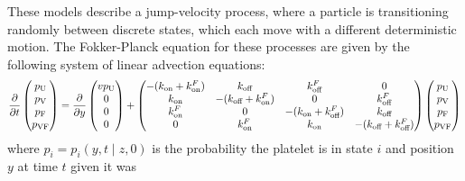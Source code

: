 \documentclass{article}
\newcommand{\tn}{\textnormal}
\newcommand{\Pder}[2]{\frac{\partial #1}{\partial #2}}
\begin{document}
These models describe a jump-velocity process, where a particle is
transitioning randomly between discrete states, which each move with a
different deterministic motion. The Fokker-Planck equation for these
processes are given by the following system of linear advection
equations:
\begin{equation}
  \Pder{}{t}
  \begin{pmatrix}
    p_\tn{U} \\ p_\tn{V} \\ p_\tn{F} \\ p_\tn{VF}
  \end{pmatrix}
  =
  \Pder{}{y}
  \begin{pmatrix}
    v p_\tn{U} \\ 0 \\ 0 \\ 0
  \end{pmatrix}
  +
  \begin{pmatrix}
    -(k_\tn{on} + k_\tn{on}^F) & k_\tn{off} & k_\tn{off}^F & 0 \\
    k_\tn{on} & -(k_\tn{off} + k_\tn{on}^F) & 0 & k_\tn{off}^F \\
    k_\tn{on}^F & 0 & -(k_\tn{on} + k_\tn{off}^F) & k_\tn{off} \\
    0 & k_\tn{on}^F & k_\tn{on} & -(k_\tn{off} + k_\tn{off}^F)
  \end{pmatrix}
  \begin{pmatrix}
    p_\tn{U} \\ p_\tn{V} \\ p_\tn{F} \\ p_\tn{VF}
  \end{pmatrix}
\end{equation}
where $p_i = p_i(y, t \mid z, 0)$ is the probability the platelet is
in state $i$ and position $y$ at time $t$ given it was 



\end{document}
